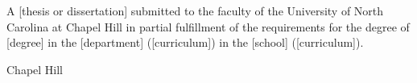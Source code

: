 
\begin{titlepage}
\begin{center}
\begingroup
\newcommand{\TitleGap}{\vspace*{\dimexpr 1in-0.25\baselineskip\relax}}
\begin{singlespace}

\MakeUppercase{\docTitle}

\TitleGap
\docAuthorFull

%
%
\TitleGap
\noindent
A [thesis or dissertation] submitted to the faculty of the University of North Carolina at Chapel Hill in partial fulfillment of the requirements for the degree of [degree] in the [department] ([curriculum]) in the [school] ([curriculum]).

\TitleGap
Chapel Hill\\
\the\year{} %


\end{singlespace}
\end{center}
\end{titlepage}
